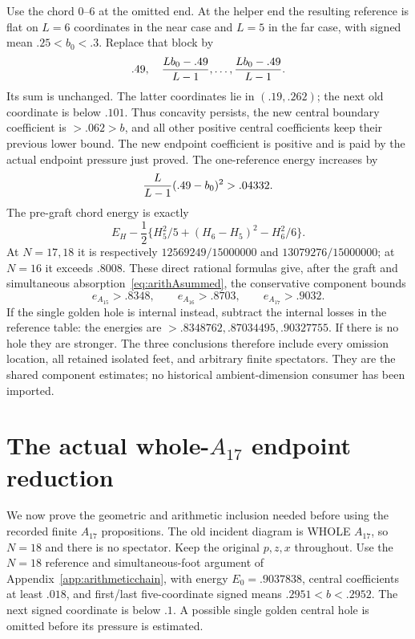 Use the chord \(0\)--\(6\) at the omitted end.
At the helper end the resulting reference is flat on \(L=6\)
coordinates in the near case and \(L=5\) in the far case,
with signed mean \(.25<b_0<.3\).
Replace that block by
\[
             .49,\quad
             {Lb_0-.49\over L-1},\ldots,
             {Lb_0-.49\over L-1}.
\]
Its sum is unchanged.  The latter coordinates lie in
\((.19,.262)\); the next old coordinate is below \(.101\).
Thus concavity persists, the new central boundary coefficient
is \(>.062>b\), and all other positive central coefficients
keep their previous lower bound.
The new endpoint coefficient is positive and is paid by the
actual endpoint pressure just proved.
The one-reference energy increases by
\[
                {L\over L-1}(.49-b_0)^2>.04332 .
\]
The pre-graft chord energy is exactly
\[
 E_H-\frac12\{H_5^2/5+(H_6-H_5)^2-H_6^2/6\}.
\]
At \(N=17,18\) it is respectively
\(12569249/15000000\) and \(13079276/15000000\);
at \(N=16\) it exceeds \(.8008\).
These direct rational formulas give, after the graft and
simultaneous absorption~\eqref{eq:arithAsummed}, the conservative
component bounds
\[
                 e_{A_{15}}>.8348,\qquad
                 e_{A_{16}}>.8703,\qquad
                 e_{A_{17}}>.9032 .
\]
If the single golden hole is internal instead, subtract the
internal losses in the reference table:
the energies are \(>.8348762,.87034495,.90327755\).
If there is no hole they are stronger.
The three conclusions therefore include every omission location,
all retained isolated feet, and arbitrary finite spectators.
They are the shared component estimates; no historical
ambient-dimension consumer has been imported.

\section{The actual whole-\(A_{17}\) endpoint reduction}
\label{app:wholearithA17}

We now prove the geometric and arithmetic inclusion needed before
using the recorded finite \(A_{17}\) propositions.
The old incident diagram is WHOLE \(A_{17}\), so \(N=18\) and
there is no spectator.
Keep the original \(p,z,x\) throughout.
Use the \(N=18\) reference and simultaneous-foot argument of
Appendix~\ref{app:arithmeticchain}, with energy
\(E_0=.9037838\), central coefficients at least \(.018\),
and first/last five-coordinate signed means
\(.2951<b<.2952\).
The next signed coordinate is below \(.1\).
A possible single golden central hole is omitted before its
pressure is estimated.

